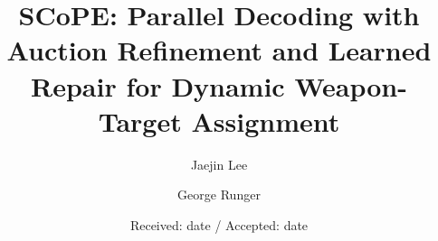 \newtheorem{proposition}{Proposition}
\newtheorem{lemma}{Lemma}
\newtheorem{corollary}{Corollary}
\newtheorem{remark}{Remark}


\def\BibTeX{{\rm B\kern-.05em{\sc i\kern-.025em b}\kern-.08em
    T\kern-.1667em\lower.7ex\hbox{E}\kern-.125emX}}



\title{SCoPE: Parallel Decoding with Auction Refinement and Learned Repair for Dynamic Weapon-Target Assignment}

\author{Jaejin Lee \and George Runger}


\date{Received: date / Accepted: date}

\maketitle


